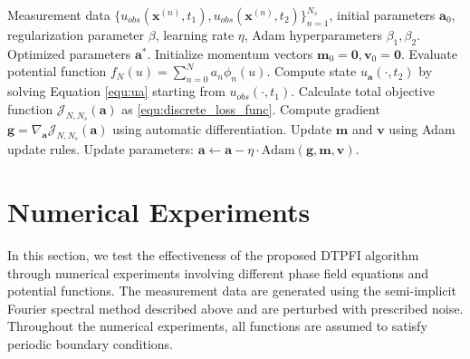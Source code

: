 \documentclass[11pt,reqno]{amsart}
\begin{document}
\begin{algorithm}[H]
\caption{DTPFI: Dual-Time Phase Field Inversion}
\label{alg}
\begin{algorithmic}[1]
\REQUIRE Measurement data $\{u_{obs}(\mathbf{x}^{(n)},t_1), u_{obs}(\mathbf{x}^{(n)},t_2)\}_{n=1}^{N_s}$, initial parameters $\mathbf{a}_0$, regularization parameter $\beta$, learning rate $\eta$, Adam hyperparameters $\beta_1, \beta_2$.
\ENSURE Optimized parameters $\mathbf{a}^*$.
\STATE Initialize momentum vectors $\mathbf{m}_0 = \mathbf{0}, \mathbf{v}_0 = \mathbf{0}$.
    \STATE Evaluate potential function $f_{N}(u) = \sum_{n=0}^N a_n \phi_n(u)$.
    \STATE Compute state $u_{\mathbf{a}}(\cdot, t_2)$ by solving Equation \eqref{equ:ua} starting from $u_{obs}(\cdot, t_1)$.
    \STATE Calculate total objective function $\mathcal{J}_{N,N_s}(\mathbf{a})$ as \eqref{equ:discrete_loss_func}.
    \STATE Compute gradient $\mathbf{g} = \nabla_{\mathbf{a}} \mathcal{J}_{N,N_s}(\mathbf{a})$ using automatic differentiation.
    \STATE Update $\mathbf{m}$ and $\mathbf{v}$ using Adam update rules.
    \STATE Update parameters: $\mathbf{a} \leftarrow \mathbf{a} - \eta \cdot \text{Adam}(\mathbf{g}, \mathbf{m}, \mathbf{v})$.
\ENDWHILE
\end{algorithmic}
\end{algorithm}

\section{Numerical Experiments}
In this section, we test the effectiveness of the proposed DTPFI algorithm through numerical experiments involving different phase field equations and potential functions. The measurement data are generated using the semi-implicit Fourier spectral method described above and are perturbed with prescribed noise. Throughout the numerical experiments, all functions are assumed to satisfy periodic boundary conditions.
\end{document}
